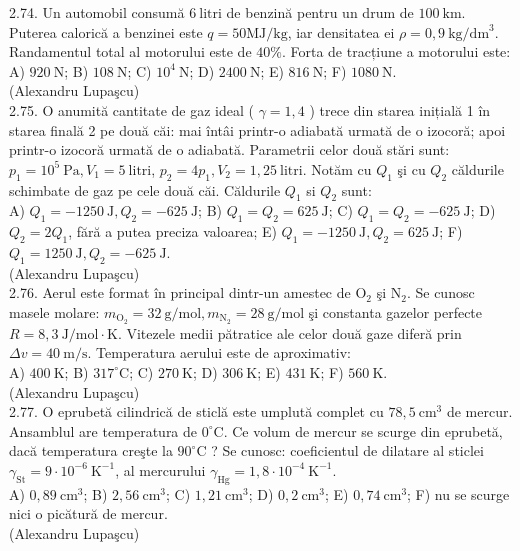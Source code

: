 2.74. Un automobil consumă $6 \mathrm{~litri}$ de benzină pentru un drum de $100 \mathrm{~km}$. Puterea calorică a benzinei este $q=50 \mathrm{MJ} / \mathrm{kg}$, iar densitatea ei $\rho=0,9 \mathrm{~kg} / \mathrm{dm}^{3}$. Randamentul total al motorului este de $40 \%$. Forta de tracțiune a motorului este:\\ A) $920 \mathrm{~N}$; B) $108 \mathrm{~N}$; C) $10^{4} \mathrm{~N}$; D) $2400 \mathrm{~N}$; E) $816 \mathrm{~N}$; F) $1080 \mathrm{~N}$.\\ (Alexandru Lupaşcu)\\

2.75. O anumită cantitate de gaz ideal ( $\gamma=1,4$ ) trece din starea inițială 1 în starea finală 2 pe două căi: mai întâi printr-o adiabată urmată de o izocoră; apoi printr-o izocoră urmată de o adiabată. Parametrii celor două stări sunt: $p_{1}=10^{5} \mathrm{~Pa}, V_{1}=5 \mathrm{~litri}$, $p_{2}=4 p_{1}, V_{2}=1,25 \mathrm{~litri}$. Notăm cu $Q_{1}$ şi cu $Q_{2}$ căldurile schimbate de gaz pe cele două căi. Căldurile $Q_{1}$ si $Q_{2}$ sunt:\\ A) $Q_{1}=-1250 \mathrm{~J}, Q_{2}=-625 \mathrm{~J}$; B) $Q_{1}=Q_{2}=625 \mathrm{~J}$; C) $Q_{1}=Q_{2}=-625 \mathrm{~J}$; D) $Q_{2}=2 Q_{1}$, fără a putea preciza valoarea; E) $Q_{1}=-1250 \mathrm{~J}, Q_{2}=625 \mathrm{~J}$; F) $Q_{1}=1250 \mathrm{~J}, Q_{2}=-625 \mathrm{~J}$.\\ (Alexandru Lupaşcu)\\

2.76. Aerul este format în principal dintr-un amestec de $\mathrm{O}_{2}$ şi $\mathrm{N}_{2}$. Se cunosc masele molare: $m_{\mathrm{O}_{2}}=32 \mathrm{~g} / \mathrm{mol}, m_{\mathrm{N}_{2}}=28 \mathrm{~g} / \mathrm{mol}$ şi constanta gazelor perfecte $R=8,3 \mathrm{~J} / \mathrm{mol} \cdot \mathrm{K}$. Vitezele medii pătratice ale celor două gaze diferă prin $\Delta v=40 \mathrm{~m} / \mathrm{s}$. Temperatura aerului este de aproximativ:\\ A) $400 \mathrm{~K}$; B) $317^{\circ} \mathrm{C}$; C) $270 \mathrm{~K}$; D) $306 \mathrm{~K}$; E) $431 \mathrm{~K}$; F) $560 \mathrm{~K}$.\\ (Alexandru Lupaşcu)\\

2.77. O eprubetă cilindrică de sticlă este umplută complet cu $78,5 \mathrm{~cm}^{3}$ de mercur. Ansamblul are temperatura de $0^{\circ} \mathrm{C}$. Ce volum de mercur se scurge din eprubetă, dacă temperatura creşte la $90^{\circ} \mathrm{C}$ ? Se cunosc: coeficientul de dilatare al sticlei $\gamma_{\mathrm{St}}=9 \cdot 10^{-6} \mathrm{~K}^{-1}$, al mercurului $\gamma_{\mathrm{Hg}}=1,8 \cdot 10^{-4} \mathrm{~K}^{-1}$.\\ A) $0,89 \mathrm{~cm}^{3}$; B) $2,56 \mathrm{~cm}^{3}$; C) $1,21 \mathrm{~cm}^{3}$; D) $0,2 \mathrm{~cm}^{3}$; E) $0,74 \mathrm{~cm}^{3}$; F) nu se scurge nici o picătură de mercur.\\ (Alexandru Lupaşcu)\\

